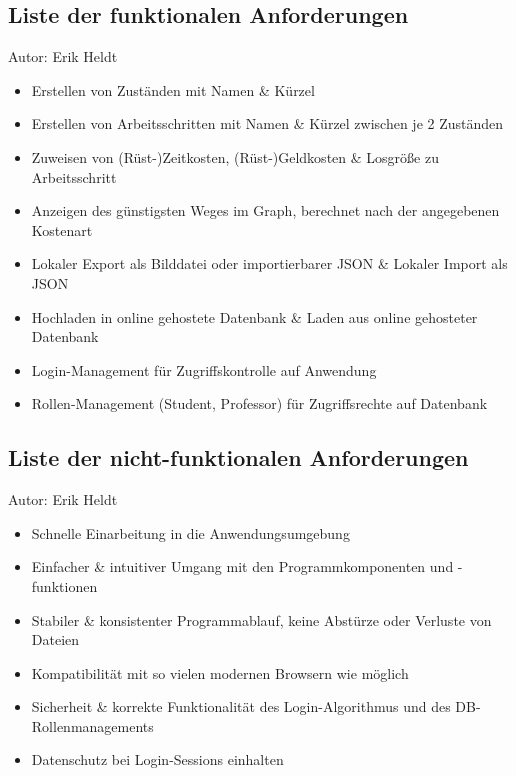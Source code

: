 \documentclass[twoside]{report}
\begin{document}
\subsection{Liste der funktionalen Anforderungen}
{\small Autor: Erik Heldt}

\begin{itemize}
	\item Erstellen von Zuständen mit Namen \& Kürzel
	\item Erstellen von Arbeitsschritten mit Namen \& Kürzel zwischen je 2 Zuständen
	\item Zuweisen von (Rüst-)Zeitkosten, (Rüst-)Geldkosten \& Losgröße zu Arbeitsschritt
	\item Anzeigen des günstigsten Weges im Graph, berechnet nach der angegebenen Kostenart
	\item Lokaler Export als Bilddatei oder importierbarer JSON \& Lokaler Import als JSON
	\item Hochladen in online gehostete Datenbank \& Laden aus online gehosteter Datenbank
	\item Login-Management für Zugriffskontrolle auf Anwendung
	\item Rollen-Management (Student, Professor) für Zugriffsrechte auf Datenbank
\end{itemize}

%
%
% 

\subsection{Liste der nicht-funktionalen Anforderungen}
{\small Autor: Erik Heldt}

\begin{itemize}
	\item Schnelle Einarbeitung in die Anwendungsumgebung
	\item Einfacher \& intuitiver Umgang mit den Programmkomponenten und -funktionen
	\item Stabiler \& konsistenter Programmablauf, keine Abstürze oder Verluste von Dateien
	\item Kompatibilität mit so vielen modernen Browsern wie möglich
	\item Sicherheit \& korrekte Funktionalität des Login-Algorithmus und des DB-Rollenmanagements
	\item Datenschutz bei Login-Sessions einhalten
\end{itemize}
\end{document}
